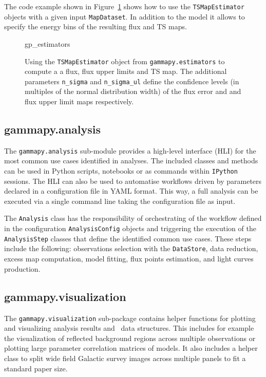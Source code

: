 \documentclass[traditabstract, longauth]{aa}
\newcommand{\code}[1]{\texttt{#1}}
\begin{document}
The code example shown in Figure~\ref{fig*:minted:gp_estimators} shows how to use
the \code{TSMapEstimator} objects with a given input \code{MapDataset}.
In addition to the model it allows to specify the energy
bins of the resulting flux and TS maps.


\begin{figure}
	{gp_estimators}
	\caption{Using the \code{TSMapEstimator} object from \code{gammapy.estimators} to compute a
        a flux, flux upper limits and TS map. The additional parameters \code{n\_sigma}
        and \code{n\_sigma\_ul} define the confidence levels (in multiples of the normal distribution width)
        of the flux error and and flux upper limit maps respectively.
    }
    \label{fig*:minted:gp_estimators}
\end{figure}

\subsection{gammapy.analysis}
\label{ssec:gammapy-analysis}
The \code{gammapy.analysis} sub-module provides a high-level interface (HLI) for the most
common use cases identified in \gammaray analyses. The included classes and methods
 can be used in Python scripts, notebooks or as commands within \texttt{IPython}
sessions. The HLI can also be used to automatise
workflows driven by parameters declared in a configuration file in YAML format.
This way, a full analysis can be executed via a single command line taking the
configuration file as input.

The \code{Analysis} class has the responsibility of orchestrating of the workflow
defined in the configuration \code{AnalysisConfig} objects and triggering the execution of
the \code{AnalysisStep} classes that define the identified common use cases. These
steps include the following: observations selection with the \code{DataStore},  data
reduction, excess map computation, model fitting, flux points estimation, and
light curves production.


\subsection{gammapy.visualization}
\label{ssec:gammapy-visualization}
The \code{gammapy.visualization} sub-package contains helper functions
for plotting and visualizing analysis results and \gammapy~data structures.
This includes for example the visualization of reflected background regions across
multiple observations or plotting large parameter correlation matrices of
\gammapy models. It also includes a helper class to split
wide field Galactic survey images across multiple panels to fit a standard
paper size.
\end{document}
